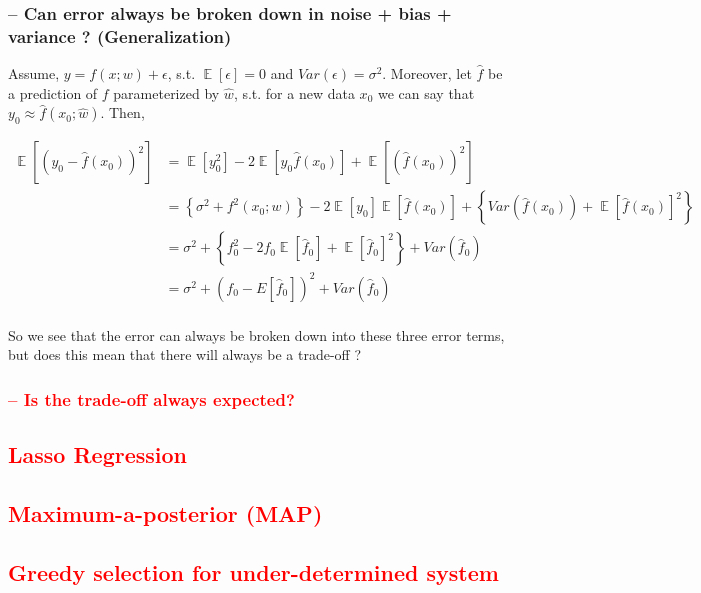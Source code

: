 \documentclass{article}
\DeclareMathOperator*{\E}{\mathop{\mathbb{E}}}
\newcommand{\red}[1]{\textcolor{red}{#1}}
\newcommand{\hrfullline}{\noindent\makebox[\linewidth]{\rule{\paperwidth}{2pt}}}
\begin{document}
\subsubsection{-- Can error always be broken down in noise + bias + variance ? (Generalization)}
Assume, $y = f(x;w)+\epsilon$, s.t. $\E[\epsilon]=0$ and $Var(\epsilon)=\sigma^2$. Moreover, let $\hat{f}$ be a prediction of $f$ parameterized by $\hat{w}$, s.t. for a new data $x_0$ we can say that $y_0 \approx \hat{f}(x_0; \hat{w})$. Then,

\begin{align*}
    \E[(y_0-\hat{f}(x_0))^2] &= \E[y_0^2] - 2\E[y_0\hat{f}(x_0)] + \E[(\hat{f}(x_0))^2]\\
    &= \left\{ \sigma^2 + f^2(x_0;w) \right\} - 2\E[y_0]\E[\hat{f}(x_0)] + \left\{ Var(\hat{f}(x_0)) + \E[\hat{f}(x_0)]^2 \right\}\\
    &= \sigma^2 + \left\{ f_0^2 - 2f_0\E[\hat{f}_0] + \E[\hat{f}_0]^2 \right\} + Var(\hat{f}_0)\\
    &= \sigma^2 + (f_0 - E[\hat{f}_0])^2 + Var(\hat{f}_0)\\
\end{align*}

So we see that the error can always be broken down into these three error terms, but does this mean that there will always be a trade-off ?

\subsubsection{\red{-- Is the trade-off always expected?}} 

\subsection{\red{Lasso Regression}}
\subsection{\red{Maximum-a-posterior (MAP)}}
\subsection{\red{Greedy selection for under-determined system}}

\hrfullline
\end{document}

